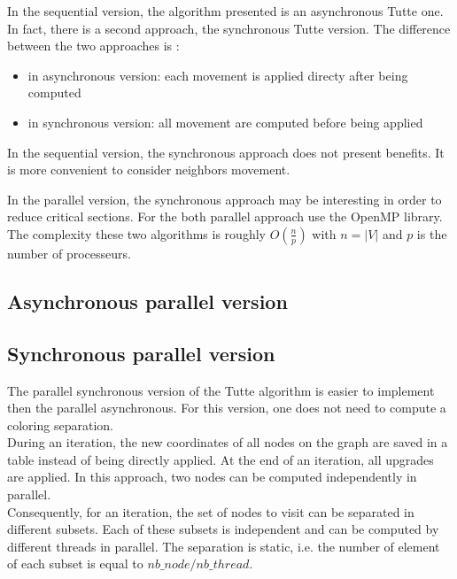 

In the sequential version, the algorithm presented is an asynchronous Tutte one. In fact, there is a second approach, the synchronous Tutte version. The difference between the two approaches is :
\begin{itemize}
\item in asynchronous version: each movement is applied directy after being computed
\item in synchronous version: all movement are computed before being applied
\end{itemize}
In the sequential version, the synchronous approach does not present
benefits. It is more convenient to consider neighbors movement.

In the parallel version, the synchronous approach may be interesting in
order to reduce critical sections. For the both parallel approach use the
OpenMP library.
\\
The complexity these two algorithms is roughly $\mathit{O(\frac{n}{p})}$
with $n = |V|$ and $p$ is the number of processeurs.
\\

\subsection{Asynchronous parallel version}


\subsection{Synchronous parallel version}

The parallel synchronous version of the Tutte algorithm is easier to
implement then the parallel asynchronous. For this version, one
does not need to compute a coloring separation.
\\

During an iteration, the new coordinates of all nodes on the graph are saved in a table instead of being
directly applied. At the end of an iteration, all upgrades are applied. In
this approach, two nodes can be computed independently in parallel. 
\\

Consequently, for an iteration, the set of nodes to visit can be separated in different
subsets. Each of these subsets is independent and can be computed by
different threads in parallel. The separation is static, i.e. the number of
element of each subset is equal to $nb\_node / nb\_thread$.

